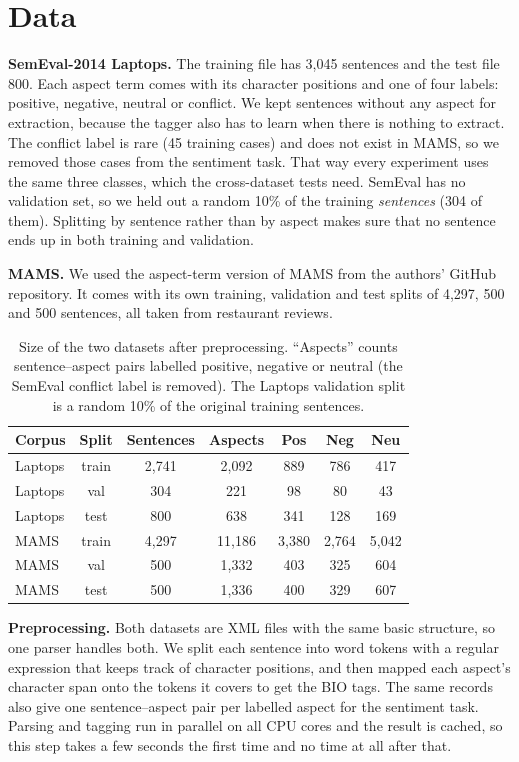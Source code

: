 \documentclass[11pt]{article}
\begin{document}
\section{Data}
\textbf{SemEval-2014 Laptops.} The training file has 3,045 sentences and the test file 800. Each aspect term comes with its character positions and one of four labels: positive, negative, neutral or conflict. We kept sentences without any aspect for extraction, because the tagger also has to learn when there is nothing to extract. The conflict label is rare (45 training cases) and does not exist in MAMS, so we removed those cases from the sentiment task. That way every experiment uses the same three classes, which the cross-dataset tests need. SemEval has no validation set, so we held out a random 10\% of the training \textit{sentences} (304 of them). Splitting by sentence rather than by aspect makes sure that no sentence ends up in both training and validation.

\textbf{MAMS.} We used the aspect-term version of MAMS from the authors' GitHub repository. It comes with its own training, validation and test splits of 4,297, 500 and 500 sentences, all taken from restaurant reviews.

\begin{table}[t]
\centering
\small
\begin{tabular}{lcccccc}
\toprule
Corpus & Split & Sentences & Aspects & Pos & Neg & Neu \\
\midrule
Laptops & train & 2,741 & 2,092 & 889 & 786 & 417 \\
Laptops & val & 304 & 221 & 98 & 80 & 43 \\
Laptops & test & 800 & 638 & 341 & 128 & 169 \\
\midrule
MAMS & train & 4,297 & 11,186 & 3,380 & 2,764 & 5,042 \\
MAMS & val & 500 & 1,332 & 403 & 325 & 604 \\
MAMS & test & 500 & 1,336 & 400 & 329 & 607 \\
\bottomrule
\end{tabular}
\caption{Size of the two datasets after preprocessing. ``Aspects'' counts sentence--aspect pairs labelled positive, negative or neutral (the SemEval conflict label is removed). The Laptops validation split is a random 10\% of the original training sentences.}
\label{tab:datasets}
\end{table}

\textbf{Preprocessing.} Both datasets are XML files with the same basic structure, so one parser handles both. We split each sentence into word tokens with a regular expression that keeps track of character positions, and then mapped each aspect's character span onto the tokens it covers to get the BIO tags. The same records also give one sentence--aspect pair per labelled aspect for the sentiment task. Parsing and tagging run in parallel on all CPU cores and the result is cached, so this step takes a few seconds the first time and no time at all after that.
\end{document}
